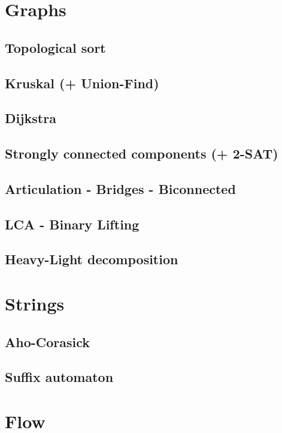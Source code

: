 \section{Graphs}
\subsection{Topological sort}
\subsection{Kruskal (+ Union-Find)}
\subsection{Dijkstra}
\subsection{Strongly connected components (+ 2-SAT)}
\subsection{Articulation - Bridges - Biconnected}
\subsection{LCA - Binary Lifting}
\subsection{Heavy-Light decomposition}

\section{Strings}
\subsection{Aho-Corasick}
\subsection{Suffix automaton}

\section{Flow}
